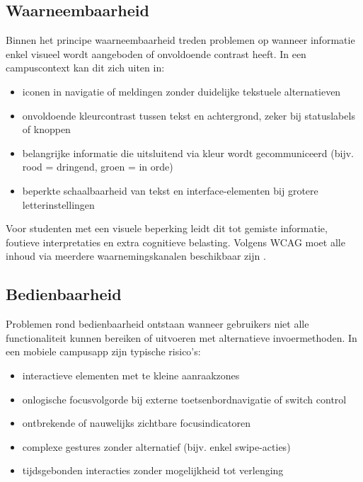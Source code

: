 \subsection{Waarneembaarheid}
\label{subsec:problemen-waarneembaarheid}

Binnen het principe waarneembaarheid treden problemen op wanneer informatie enkel visueel wordt aangeboden of onvoldoende contrast heeft. In een campuscontext kan dit zich uiten in:

\begin{itemize}
    \item iconen in navigatie of meldingen zonder duidelijke tekstuele alternatieven
    \item onvoldoende kleurcontrast tussen tekst en achtergrond, zeker bij statuslabels of knoppen
    \item belangrijke informatie die uitsluitend via kleur wordt gecommuniceerd (bijv. rood = dringend, groen = in orde)
    \item beperkte schaalbaarheid van tekst en interface-elementen bij grotere letterinstellingen
\end{itemize}

Voor studenten met een visuele beperking leidt dit tot gemiste informatie, foutieve interpretaties en extra cognitieve belasting. Volgens WCAG moet alle inhoud via meerdere waarnemingskanalen beschikbaar zijn \autocite{W3CWCAG21}.

\subsection{Bedienbaarheid}
\label{subsec:problemen-bedienbaarheid}

Problemen rond bedienbaarheid ontstaan wanneer gebruikers niet alle functionaliteit kunnen bereiken of uitvoeren met alternatieve invoermethoden. In een mobiele campusapp zijn typische risico's:

\begin{itemize}
    \item interactieve elementen met te kleine aanraakzones
    \item onlogische focusvolgorde bij externe toetsenbordnavigatie of switch control
    \item ontbrekende of nauwelijks zichtbare focusindicatoren
    \item complexe gestures zonder alternatief (bijv. enkel swipe-acties)
    \item tijdsgebonden interacties zonder mogelijkheid tot verlenging
\end{itemize}

